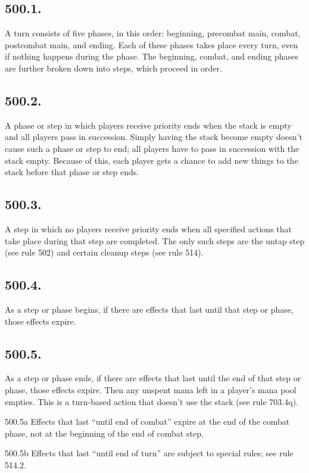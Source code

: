 \subsection*{500.1.}
A turn consists of five phases, in this order: beginning, precombat main, combat, postcombat main, and ending. Each of these phases takes place every turn, even if nothing happens during the phase. The beginning, combat, and ending phases are further broken down into steps, which proceed in order.

\subsection*{500.2.}
A phase or step in which players receive priority ends when the stack is empty and all players pass in succession. Simply having the stack become empty doesn’t cause such a phase or step to end; all players have to pass in succession with the stack empty. Because of this, each player gets a chance to add new things to the stack before that phase or step ends.

\subsection*{500.3.}
A step in which no players receive priority ends when all specified actions that take place during that step are completed. The only such steps are the untap step (see rule 502) and certain cleanup steps (see rule 514).

\subsection*{500.4.}
As a step or phase begins, if there are effects that last until that step or phase, those effects expire.

\subsection*{500.5.}
As a step or phase ends, if there are effects that last until the end of that step or phase, those effects expire. Then any unspent mana left in a player’s mana pool empties. This is a turn-based action that doesn’t use the stack (see rule 703.4q).

500.5a Effects that last “until end of combat” expire at the end of the combat phase, not at the beginning of the end of combat step.

500.5b Effects that last “until end of turn” are subject to special rules; see rule 514.2.

